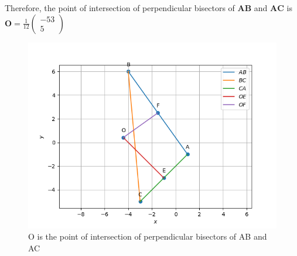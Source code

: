 \documentclass[journal,12pt,twocolumn]{IEEEtran}
\theoremstyle{remark}
\newcommand{\myvec}[1]{\ensuremath{\begin{pmatrix}#1\end{pmatrix}}}
\let\vec\mathbf
\begin{document}
Therefore, the point of intersection of perpendicular bisectors of $\vec{AB}$ and $\vec{AC}$ is $\vec{O} = \frac{1}{12}\myvec{-53\\5}$
\begin{figure}

\centering

\includegraphics[width=\columnwidth]{./figs/Figure_1}

\caption{O is the point of intersection of perpendicular bisectors of AB and AC}

\label{fig:Figure_2}

\end{figure}
\end{document}

